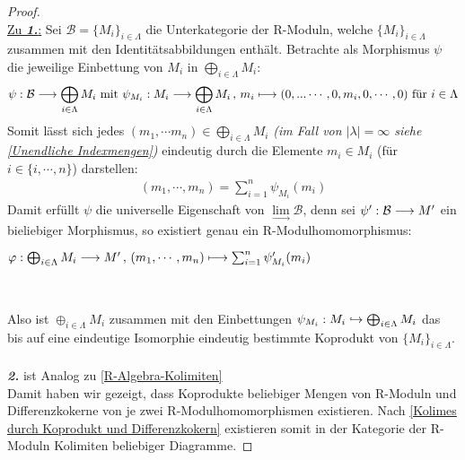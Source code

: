\documentclass[10pt,a4paper]{report}
\newcommand{\comment}[1]{}
\newcommand{\functionfront}[3]{\nolinebreak{#1:#2 \longrightarrow #3}}
\newcommand{\function}[5]{\nolinebreak{#1:#2 \longrightarrow #3 \, , \, #4 \longmapsto #5}}
\newcommand{\infunctionfront}[3]{\nolinebreak{#1:#2 \hookrightarrow #3}}
\newcommand{\colimes}[0]{\lim\limits_{ \longrightarrow }}
\begin{document}
\begin{proof} \ \\
\underline{Zu \textit{\textbf{1.}}:}
Sei $\mathcal{B} = \lbrace M_i \rbrace_{i \in \Lambda}$ die Unterkategorie der R-Moduln, welche $\lbrace M_i \rbrace_{i \in \Lambda}$ zusammen mit den Identitätsabbildungen enthält. Betrachte als Morphismus $\psi$ die jeweilige Einbettung von $M_i$ in $\bigoplus_{i \in \Lambda} M_i$:
\begin{gather*}
\functionfront{\psi}{\mathcal{B}}{\bigoplus_{i \in \Lambda} M_i} \text{ mit } \function{\psi_{M_i}}{M_i}{\bigoplus_{i \in \Lambda} M_i}{m_i}{(0, ...\cdots ,0,m_i,0, \cdots ,0)} \text{ für } i \in \Lambda
\end{gather*}
Somit lässt sich jedes $(m_1, \cdots m_n) \in \bigoplus_{i \in \Lambda} M_i$ \textit{(im Fall von $\vert \lambda \vert = \infty$ siehe \cref{Unendliche Indexmengen})} eindeutig durch die Elemente $m_i \in M_i$ (für $i \in \lbrace i , \cdots , n \rbrace$) darstellen:
\begin{gather*}
(m_1, \cdots ,m_n) = \sum_{i = 1}^n \psi_{M_i}(m_i)
\end{gather*}
Damit erfüllt $\psi$ die universelle Eigenschaft von $\colimes \mathcal{B}$, denn sei $\functionfront{\psi'}{\mathcal{B}}{M'}$ ein bieliebiger Morphismus, so existiert genau ein R-Modulhomomorphismus:
\begin{center}
$\function{\varphi}{\bigoplus_{i \in \Lambda} M_i }{M'}{(m_1, \cdots , m_n)}{\sum_{i = 1}^n \psi'_{M_i}(m_i)}$
\\
\end{center}
\comment{
Für ein beliebiges $i$ existiert genau ein $\function{\varphi_i}{M_i \oplus 0}{M'}{(0,...,0,m_i,0,...,0}{\psi_i '(m_i)}$ mit $\psi_i ' = \psi_i \circ \varphi_i$\\
$\Rightarrow  \exists ! \function{\varphi}{\bigoplus_i M_i}{M'}{(m_1,...,m_n)}{\sum_i \psi_i(m_i)}$\\
}
Also ist $\oplus_{i \in \Lambda} M_i$ zusammen mit den Einbettungen $\infunctionfront{\psi_{M_i}}{M_i}{\bigoplus_{i \in \Lambda} M_i}$ das bis auf eine eindeutige Isomorphie eindeutig bestimmte Koprodukt von $\lbrace M_i \rbrace_{i \in \Lambda}$.
\ \\
\textit{\textbf{2.}} ist Analog zu \cref{R-Algebra-Kolimiten}
\ \\
Damit haben wir gezeigt, dass Koprodukte beliebiger Mengen von R-Moduln und Differenzkokerne von je zwei R-Modulhomomorphismen existieren. Nach \cref{Kolimes durch Koprodukt und Differenzkokern} existieren somit in der Kategorie der R-Moduln Kolimiten beliebiger Diagramme.
\end{proof}
\end{document}
